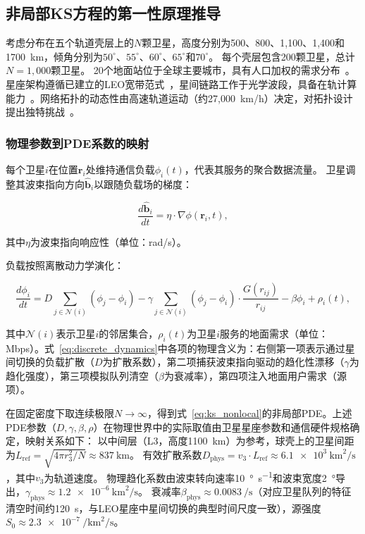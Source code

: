 \documentclass[sn-nature,pdflatex]{sn-jnl}
\begin{document}
\subsection{非局部KS方程的第一性原理推导}

考虑分布在五个轨道壳层上的$N$颗卫星，高度分别为500、800、1,100、1,400和\SI{1700}{\km}，倾角分别为$50^\circ$、$55^\circ$、$60^\circ$、$65^\circ$和$70^\circ$。
每个壳层包含200颗卫星，总计$N=1,000$颗卫星。
20个地面站位于全球主要城市，具有人口加权的需求分布~\cite{kodheli_2021}。
星座架构遵循已建立的LEO宽带范式~\cite{su_2019,leyva_mayorga_2020,chaudhry_2020}，星间链路工作于光学波段，具备在轨计算能力~\cite{bhattacherjee_2020}。网络拓扑的动态性由高速轨道运动（约27,000~km/h）决定，对拓扑设计提出独特挑战~\cite{bhattacherjee_2019}。

\subsubsection{物理参数到PDE系数的映射}

每个卫星$i$在位置$\mathbf{r}_i$处维持通信负载$\phi_i(t)$，代表其服务的聚合数据流量。
卫星调整其波束指向方向$\hat{\mathbf{b}}_i$以跟随负载场的梯度：

\begin{equation}
\frac{d\hat{\mathbf{b}}_i}{dt} = \eta \cdot \nabla \phi(\mathbf{r}_i, t),
\end{equation}

其中$\eta$为波束指向响应性（单位：rad/s）。

负载按照离散动力学演化：

\begin{equation}
\label{eq:discrete_dynamics}
\frac{d\phi_i}{dt} = D \sum_{j \in \mathcal{N}(i)} (\phi_j - \phi_i) - \gamma \sum_{j \in \mathcal{N}(i)} (\phi_j - \phi_i) \cdot \frac{G(r_{ij})}{r_{ij}} - \beta \phi_i + \rho_i(t),
\end{equation}

其中$\mathcal{N}(i)$表示卫星$i$的邻居集合，$\rho_i(t)$为卫星$i$服务的地面需求（单位：Mbps）。式~\eqref{eq:discrete_dynamics}中各项的物理含义为：右侧第一项表示通过星间切换的负载扩散（$D$为扩散系数），第二项捕获波束指向驱动的趋化性漂移（$\gamma$为趋化强度），第三项模拟队列清空（$\beta$为衰减率），第四项注入地面用户需求（源项）。

在固定密度下取连续极限$N \to \infty$，得到式~\eqref{eq:ks_nonlocal}的非局部PDE。上述PDE参数（$D, \gamma, \beta, \rho$）在物理世界中的实际取值由卫星星座参数和通信硬件规格确定，映射关系如下：
以中间层（L3，高度\SI{1100}{\km}）为参考，球壳上的卫星间距为$L_{\text{ref}} = \sqrt{4\pi r_3^2 / N} \approx \SI{837}{\km}$。
有效扩散系数$D_{\text{phys}} = v_3 \cdot L_{\text{ref}} \approx \SI{6.1e3}{\km\squared\per\second}$，其中$v_3$为轨道速度。
物理趋化系数由波束转向速率\SI{10}{\degree\per\second}和波束宽度\SI{2}{\degree}导出，$\gamma_{\text{phys}} \approx \num{1.2e-6}~\si{\km\squared\per\second}$。
衰减率$\beta_{\text{phys}} \approx \SI{0.0083}{\per\second}$（对应卫星队列的特征清空时间约120~s，与LEO星座中星间切换的典型时间尺度一致），源强度$S_0 \approx \SI{2.3e-7}{\per\km\squared\per\second}$。
\end{document}
